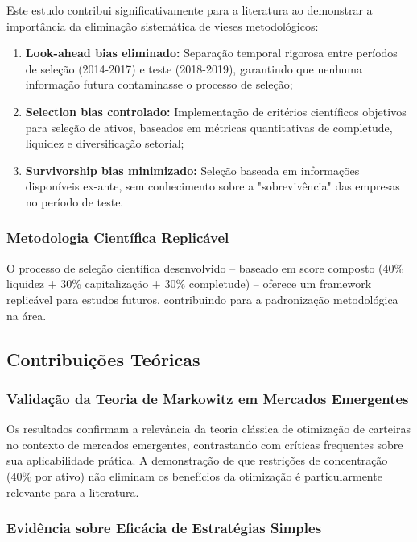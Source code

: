 Este estudo contribui significativamente para a literatura ao demonstrar a importância da eliminação sistemática de vieses metodológicos:

\begin{enumerate}
    \item \textbf{Look-ahead bias eliminado:} Separação temporal rigorosa entre períodos de seleção (2014-2017) e teste (2018-2019), garantindo que nenhuma informação futura contaminasse o processo de seleção;
    
    \item \textbf{Selection bias controlado:} Implementação de critérios científicos objetivos para seleção de ativos, baseados em métricas quantitativas de completude, liquidez e diversificação setorial;
    
    \item \textbf{Survivorship bias minimizado:} Seleção baseada em informações disponíveis ex-ante, sem conhecimento sobre a "sobrevivência" das empresas no período de teste.
\end{enumerate}

\subsubsection{Metodologia Científica Replicável}

O processo de seleção científica desenvolvido -- baseado em score composto (40\% liquidez + 30\% capitalização + 30\% completude) -- oferece um framework replicável para estudos futuros, contribuindo para a padronização metodológica na área.

\subsection{Contribuições Teóricas}

\subsubsection{Validação da Teoria de Markowitz em Mercados Emergentes}

Os resultados confirmam a relevância da teoria clássica de otimização de carteiras no contexto de mercados emergentes, contrastando com críticas frequentes sobre sua aplicabilidade prática. A demonstração de que restrições de concentração (40\% por ativo) não eliminam os benefícios da otimização é particularmente relevante para a literatura.

\subsubsection{Evidência sobre Eficácia de Estratégias Simples}

